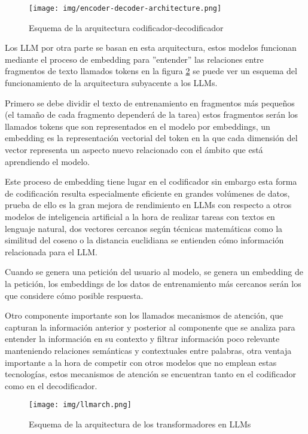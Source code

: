 \begin{figure}[h]
    \centering
    \texttt{[image: img/encoder-decoder-architecture.png]}
    \caption{Esquema de la arquitectura codificador-decodificador}
    \label{fig:coddecod}
\end{figure}

Los LLM por otra parte se basan en esta arquitectura, estos modelos funcionan mediante el proceso de embedding para ''entender'' las relaciones entre fragmentos de texto llamados tokens en la figura \ref{fig:llmarch} se puede ver un esquema del funcionamiento de la arquitectura subyacente a los LLMs.

Primero se debe dividir el texto de entrenamiento en fragmentos más pequeños (el tamaño de cada fragmento dependerá de la tarea) estos fragmentos serán los llamados tokens que son representados en el modelo por embeddings, un embedding es la representación vectorial del token en la que cada dimensión del vector representa un aspecto nuevo relacionado con el ámbito que está aprendiendo el modelo.

Este proceso de embedding tiene lugar en el codificador sin embargo esta forma de codificación resulta especialmente eficiente en grandes volúmenes de datos, prueba de ello es la gran mejora de rendimiento en LLMs con respecto a otros modelos de inteligencia artificial a la hora de realizar tareas con textos en lenguaje natural, dos vectores cercanos según técnicas matemáticas como la similitud del coseno o la distancia euclidiana se entienden cómo información relacionada para el LLM.

Cuando se genera una petición del usuario al modelo, se genera un embedding de la petición, los embeddings de los datos de entrenamiento más cercanos serán los que considere cómo posible respuesta.

Otro componente importante son los llamados mecanismos de atención, que capturan la información anterior y posterior al componente que se analiza para entender la información en su contexto y filtrar información poco relevante  manteniendo relaciones semánticas y contextuales entre palabras, otra ventaja importante a la hora de competir con otros modelos que no emplean estas tecnologías, estos mecanismos de atención se encuentran tanto en el codificador como en el decodificador.

\begin{figure}[h]
    \centering
    \texttt{[image: img/llmarch.png]}
    \caption{Esquema de la arquitectura de los transformadores en LLMs}
    \label{fig:llmarch}
\end{figure}

